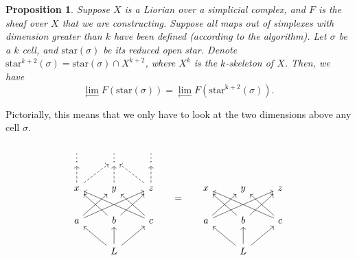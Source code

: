 \documentclass{article}
\newtheorem{proposition}{Proposition}
\theoremstyle{definition}
\begin{document}
\begin{proposition}
Suppose $X$ is a Liorian over a simplicial complex, and $F$ is the sheaf over $X$ that we are constructing. Suppose all maps out of simplexes with dimension greater than $k$ have been defined (according to the algorithm). Let $\sigma$ be a $k$ cell, and $\mathrm{star}(\sigma)$ be its reduced open star. Denote $\mathrm{star}^{k+2}(\sigma) = \mathrm{star}(\sigma) \cap X^{k+2}$, where $X^k$ is the $k$-skeleton of $X$.  Then, we have
\begin{equation}
	\lim_{\longleftarrow} F(\mathrm{star}(\sigma)) = \lim_{\longleftarrow} F(\mathrm{star^{k+2}}(\sigma)).
\end{equation}
\end{proposition}
Pictorially, this means that we only have to look at the two dimensions above any cell $\sigma$.

\[
\begin{tikzcd}
	\vdots & \vdots & \vdots \\
	x \arrow[dashed]{ur} \arrow[dashed]{u}& y \arrow[dashed]{u} & z \arrow[dashed]{u} \arrow[dashed]{ul}\\
	a \arrow{ur} \arrow{urr} & b\arrow{ur} \arrow{ul} & c \arrow{ul} \arrow{ull} \\
	& L \arrow{ul} \arrow{u} \arrow{ur} &
\end{tikzcd}
\hspace{15pt}=\hspace{15pt}
\begin{tikzcd}
	{\color{white}\vdots} & {\color{white}\vdots} & {\color{white}\vdots} \\
	x & y & z \\
	a \arrow{ur} \arrow{urr} & b\arrow{ur} \arrow{ul} & c \arrow{ul} \arrow{ull} \\
	& L \arrow{ul} \arrow{u} \arrow{ur} &
\end{tikzcd}
\]
\end{document}
